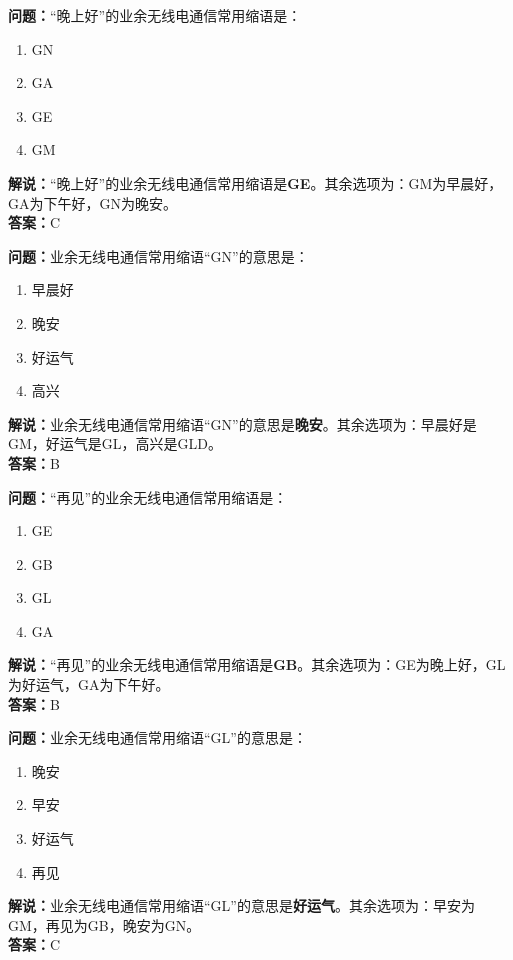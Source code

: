 \bigskip


\noindent\textbf{问题：}“晚上好”的业余无线电通信常用缩语是：
\begin{enumerate}[label=\Alph*), leftmargin=3em]
\item GN
\item GA
\item GE
\item GM
\end{enumerate}
\noindent\textbf{解说：}“晚上好”的业余无线电通信常用缩语是\textbf{GE}。其余选项为：GM为早晨好，GA为下午好，GN为晚安。\\\noindent\textbf{答案：}C



\bigskip


\noindent\textbf{问题：}业余无线电通信常用缩语“GN”的意思是：
\begin{enumerate}[label=\Alph*), leftmargin=3em]
\item 早晨好
\item 晚安
\item 好运气
\item 高兴
\end{enumerate}
\noindent\textbf{解说：}业余无线电通信常用缩语“GN”的意思是\textbf{晚安}。其余选项为：早晨好是GM，好运气是GL，高兴是GLD。\\\noindent\textbf{答案：}B

\bigskip


\noindent\textbf{问题：}“再见”的业余无线电通信常用缩语是：
\begin{enumerate}[label=\Alph*), leftmargin=3em]
\item GE
\item GB
\item GL
\item GA
\end{enumerate}
\noindent\textbf{解说：}“再见”的业余无线电通信常用缩语是\textbf{GB}。其余选项为：GE为晚上好，GL为好运气，GA为下午好。\\\noindent\textbf{答案：}B



\bigskip


\noindent\textbf{问题：}业余无线电通信常用缩语“GL”的意思是：
\begin{enumerate}[label=\Alph*), leftmargin=3em]
\item 晚安
\item 早安
\item 好运气
\item 再见
\end{enumerate}
\noindent\textbf{解说：}业余无线电通信常用缩语“GL”的意思是\textbf{好运气}。其余选项为：早安为GM，再见为GB，晚安为GN。\\\noindent\textbf{答案：}C



